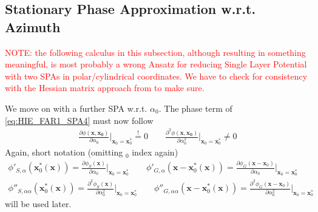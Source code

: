 \documentclass[a4paper,BCOR=15mm,10pt,twoside]{scrartcl}
\newcommand{\fscom}[2][red]{\textcolor{#1}{#2}}  %
\newcommand\azx{\alpha}  %
\renewcommand{\vec}[1]{\mathbf{#1}}  %
\begin{document}
 \subsection{Stationary Phase Approximation w.r.t. Azimuth}
\fscom{NOTE: the following calculus in this subsection, although resulting in something meaningful, is most probably a wrong Ansatz for reducing Single Layer Potential with two SPAs in polar/cylindrical coordinates. We have to check for consistency with the Hessian matrix approach from \cite[App. B]{Firtha2018Diss} to make sure.}

We move on with a further SPA w.r.t. $\azx_0$. The phase term of \eqref{eq:HIE_FAR1_SPA4} must now follow
%
\begin{align}
\frac{\partial \phi(\vec{x}, \vec{x_0})}{\partial \azx_0}\bigg|_{\vec{x}_0=\vec{x}_0^*} \stackrel{!}{=} 0\qquad 
\frac{\partial^2 \phi(\vec{x}, \vec{x_0})}{\partial \azx_0^2}\bigg|_{\vec{x}_0=\vec{x}_0^*} \neq 0
\end{align}
%
Again, short notation (omitting $_0$ index again)
%
\begin{align}
\phi'_{S,\azx}(\vec{x}_0^*(\vec{x})) = \frac{\partial \phi_{S}(\vec{x})}{\partial \azx_0}\bigg|_{\vec{x}_0=\vec{x}_0^*}\qquad
\phi'_{G,\azx}(\vec{x}-\vec{x}_0^*(\vec{x})) = \frac{\partial \phi_{G}(\vec{x}-\vec{x}_0)}{\partial \azx_0}\bigg|_{\vec{x}_0=\vec{x}_0^*} \\
\phi''_{S,\azx\azx}(\vec{x}_0^*(\vec{x})) = \frac{\partial^2 \phi_{S}(\vec{x})}{\partial \azx_0^2}\bigg|_{\vec{x}_0=\vec{x}_0^*}\qquad
\phi''_{G,\azx\azx}(\vec{x}-\vec{x}_0^*(\vec{x})) = \frac{\partial^2 \phi_{G}(\vec{x}-\vec{x}_0)}{\partial \azx_0^2}\bigg|_{\vec{x}_0=\vec{x}_0^*}
\end{align}
%
will be used later.
%
\end{document}
